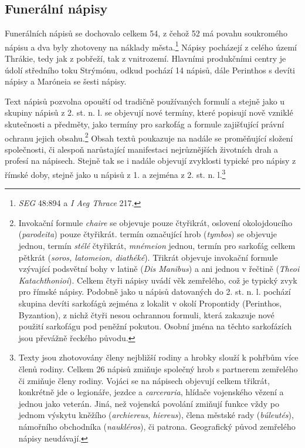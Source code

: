 
\subsection[funerální-nápisy-14]{Funerální nápisy}

Funerálních nápisů se dochovalo celkem 54, z čehož 52 má povahu soukromého nápisu a dva byly zhotoveny na náklady města.\footnote{{\em SEG} 48:894 a {\em I Aeg Thrace} 217.} Nápisy pocházejí z celého území Thrákie, tedy jak z pobřeží, tak z vnitrozemí. Hlavními produkčními centry je údolí středního toku Strýmónu, odkud pochází 14 nápisů, dále Perinthos s devíti nápisy a Maróneia se šesti nápisy.

Text nápisů pozvolna opouští od tradičně používaných formulí a stejně jako u skupiny nápisů z 2. st. n. l. se objevují nové termíny, které popisují nově vzniklé skutečnosti a předměty, jako termíny pro sarkofág a formule zajišťující právní ochranu jejich obsahu.\footnote{Invokační formule {\em chaire} se objevuje pouze čtyřikrát, oslovení okolojdoucího ({\em parodeita}) pouze čtyřikrát. termín označující hrob ({\em tymbos}) se objevuje jednou, termín {\em stélé} čtyřikrát, {\em mnémeion} jednou, termín pro sarkofág celkem pětkrát ({\em soros, latomeion, diathéké}). Třikrát objevuje invokační formule vzývající podsvětní bohy v latině ({\em Dis Manibus}) a ani jednou v řečtině ({\em Theoi Katachthonioi}). Celkem čtyři nápisy uvádí věk zemřelého, což je typický zvyk pro římské nápisy. Podobně jako u nápisů datovaných do 2. st. n. l. pochází skupina devíti sarkofágů zejména z lokalit v okolí Propontidy (Perinthos, Byzantion), z nichž čtyři nesou ochrannou formuli, která zakazuje nové použití sarkofágu pod peněžní pokutou. Osobní jména na těchto sarkofázích jsou převážně řeckého původu.} Obsah textů poukazuje na nadále se proměňující složení společnosti, či alespoň narůstající manifestaci nejrůznějších životních drah a profesí na nápisech. Stejně tak se i nadále objevují zvyklosti typické pro nápisy z římské doby, stejně jako u nápisů z 1. a zejména z 2. st. n. l.\footnote{Texty jsou zhotovovány členy nejbližší rodiny a hrobky slouží k pohřbům více členů rodiny. Celkem 26 nápisů zmiňuje společný hrob s partnerem zemřelého či zmiňuje členy rodiny. Vojáci se na nápisech objevují celkem třikrát, konkrétně jde o legionáře, jezdce a {\em carceraria}, hlídače vojenského vězení a jednou jako veterán. Jiná, než vojenská povolání zmiňují funkce vždy po jednom výskytu kněžího ({\em archiereus}, {\em hiereus}), člena městské rady ({\em búleutés}), námořního obchodníka ({\em naukléros}), či patrona. Geografický původ zemřelého nápisy neudávají.}

